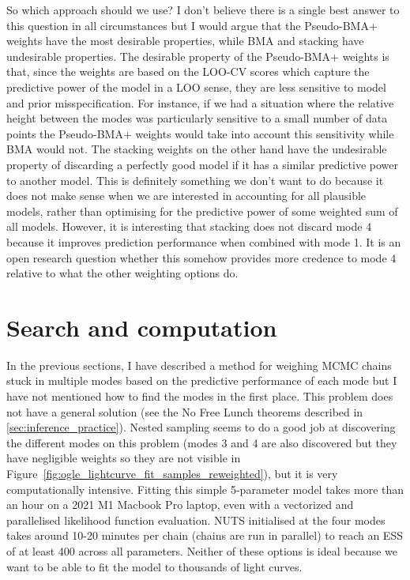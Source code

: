 \documentclass[12pt,dvipsnames]{report}
\begin{document}
So which approach should we use? I don't believe there is a single best answer 
to this question in all circumstances but I would argue that the Pseudo-BMA+ weights 
have the most desirable properties, while BMA and stacking have undesirable properties.
The desirable property of the Pseudo-BMA+ weights is that, since the weights are based 
on the LOO-CV scores which capture the predictive power of the model in a LOO sense, 
they are less sensitive to model and prior misspecification. For instance, if we 
had a situation where the relative height between the modes was 
particularly sensitive to a small number of data points the Pseudo-BMA+ weights 
would take into account this sensitivity while BMA would not.
The stacking weights on the other hand have the undesirable property of discarding
a perfectly good model if it has a similar predictive power to another model. This is 
definitely something we don't want to do because it does not make sense when we 
are interested in accounting for all plausible models, rather than optimising for 
the predictive power of some weighted sum of all models. However, it is interesting 
that stacking does not discard mode 4 because it improves prediction performance 
when combined with mode 1. It is an open research question whether this somehow provides 
more credence to mode 4 relative to what the other weighting options do.

\section{Search and computation}
\label{sec:search_and_computation}
In the previous sections, I have described a method for weighing MCMC chains stuck 
in multiple modes based on the predictive performance of each mode but I have not
mentioned how to find the modes in the first place. This problem does not have a general
solution (see the No Free Lunch theorems described in \ref{sec:inference_practice}). 
Nested sampling seems to do a good job at discovering the different modes on this 
problem (modes 3 and 4 are also discovered but they have negligible weights so they 
are not visible in Figure~\ref{fig:ogle_lightcurve_fit_samples_reweighted}), but it is 
very computationally intensive. Fitting this simple 5-parameter model takes more 
than an hour on a 2021 M1 Macbook Pro laptop, even with a vectorized and 
parallelised likelihood function evaluation. NUTS initialised at the four modes takes 
around 10-20 minutes per chain (chains are run in parallel) to reach an ESS of at least 
400 across all parameters. Neither of these options is ideal because we want to be able 
to fit the model to thousands of light curves.
\end{document}
